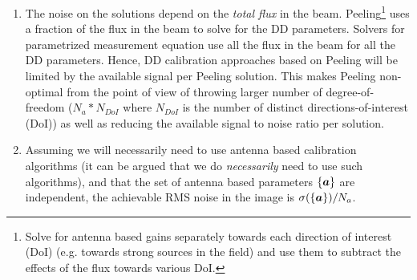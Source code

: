 \documentclass[11pt]{article}
\def\vec#1{\ensuremath{\mathchoice{\mbox{\boldmath$\displaystyle#1$}}
{\mbox{\boldmath$\textstyle#1$}}
{\mbox{\boldmath$\scriptstyle#1$}}
{\mbox{\boldmath$\scriptscriptstyle#1$}}}}
\begin{document}
\begin{enumerate}
\item The noise on the solutions depend on the {\it total flux} in the
  beam.  Peeling\footnote{Solve for antenna based gains separately
    towards each direction of interest (DoI) (e.g. towards strong
    sources in the field) and use them to subtract the effects of the
    flux towards various DoI.} uses a fraction of the flux in the beam
  to solve for the DD parameters.  Solvers for parametrized
  measurement equation use all the flux in the beam for all the DD
  parameters.  Hence, DD calibration approaches based on Peeling will
  be limited by the available signal per Peeling solution.  This makes
  Peeling non-optimal from the point of view of throwing larger number
  of degree-of-freedom ($N_a*N_{DoI}$ where $N_{DoI}$ is the number of
  distinct directions-of-interest (DoI)) as well as reducing the
  available signal to noise ratio per solution.

\item Assuming we will necessarily need to use antenna based
  calibration algorithms (it can be argued that we do {\it
    necessarily} need to use such algorithms), and that the set of
  antenna based parameters $\{\vec{a}\}$ are independent, the
  achievable RMS noise in the image is
  $\sigma(\{\vec{a}\})/N_a$.

\end{enumerate}


%
%
\end{document}
